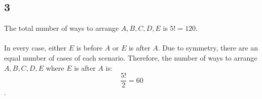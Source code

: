 \documentclass[12pt]{article}
\begin{document}
\subsection*{3}
The total number of ways to arrange $A,B,C,D,E$ is $5! = 120$.
\\ \\
In every case, either $E$ is before $A$ or $E$ is after $A$. Due to symmetry, there are an equal number of cases of each scenario.
Therefore, the number of ways to arrange $A,B,C,D,E$ where $E$ is after $A$ is: 
\\
$$\frac{5!}{2} = 60$$.
\end{document}
